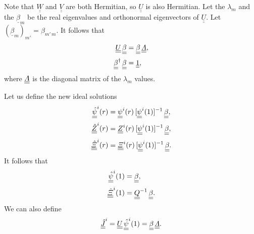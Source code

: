 \documentclass[12pt,prb,aps,notitlepage]{revtex4-1}
\begin{document}
Note that $\underline{\underline{W}}$ and $\underline{\underline{V}}$ are both Hermitian, so $\underline{\underline{U}}$ is also
Hermitian. Let 
 the  $\lambda_m$ and the $\underline{\beta}_m$ be the real eigenvalues and orthonormal eigenvectors of $\underline{\underline{U}}$. Let $(\underline{\beta}_m)_{m'} = \beta_{m'\,m}$. It follows that 
 \begin{align}
\underline{\underline{U}}\,\underline{\underline{\beta}}&=\underline{\underline{\beta}}\,\underline{\underline{{\mit\Lambda}}},\\[0.5ex]
\underline{\underline{\beta}}^\dag\,\underline{\underline{\beta}}&= \underline{\underline{1}},\label{e56a}
\end{align}
where $\underline{\underline{\mit\Lambda}}$ is the diagonal matrix of the $\lambda_m$ values. 

Let us define the new ideal solutions
\begin{align}
\underline{\underline{\hat{\psi}}}^i(r)&=\underline{\underline{\psi}}^i(r)\,[\underline{\underline{\psi}}^i(1)]^{-1}\,\underline{\underline{\beta}},\\[0.5ex]
\underline{\underline{\hat{Z}}}^i(r)   &=\underline{\underline{Z}}^i(r)\,[\underline{\underline{\psi}}^{i}(1)]^{-1}\,\underline{\underline{\beta}},\\[0.5ex]
\underline{\underline{\hat{\mit\Xi}}}^i(r)   &=\underline{\underline{\mit\Xi}}^i(r)\,[\underline{\underline{\psi}}^{i}(1)]^{-1}\,\underline{\underline{\beta}}.
\end{align}
It follows that
\begin{align}
\underline{\underline{\hat{\psi}}}^i(1)&=\underline{\underline{\beta}},\\[0.5ex]
\underline{\underline{\hat{\mit\Xi}}}^i(1)&=\underline{\underline{Q}}^{-1}\,\underline{\underline{\beta}}.
\end{align}
We can also define
\begin{equation}
\underline{\underline{\hat{J}}}^i=\underline{\underline{U}}\,\underline{\underline{\hat{\psi}}}^i(1)= \underline{\underline{\beta}}\,\underline{\underline{\mit\Lambda}}.
\end{equation}
\end{document}
